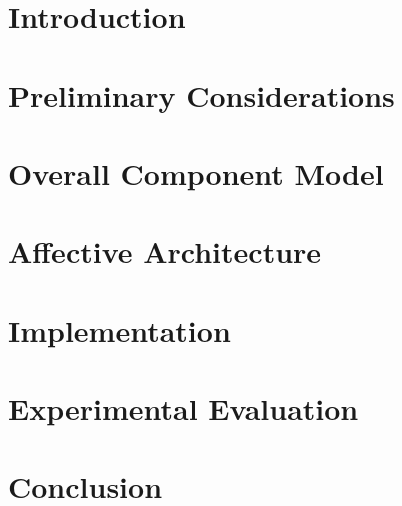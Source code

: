 \documentclass[draft,final]{vutinfth}
\begin{document}
	\chapter{Introduction}
	
	
	
	\chapter{Preliminary Considerations}\label{ch:preliminaryConsiderations}
	
	
	
	\chapter{Overall Component Model}\label{ch:componentModel}
	
	
	
	\chapter{Affective Architecture}\label{ch:affectiveArchitecture}
	
	
	
	\chapter{Implementation}\label{ch:implementation}
	
	
	
	\chapter{Experimental Evaluation}\label{ch:experimentalEvaluation}
	
	
	
	\chapter{Conclusion}\label{ch:conclusion}
	
	
	
	
	
	
	\backmatter
	
	
	
	
	\printindex
	
	
	
	
	
\end{document}
